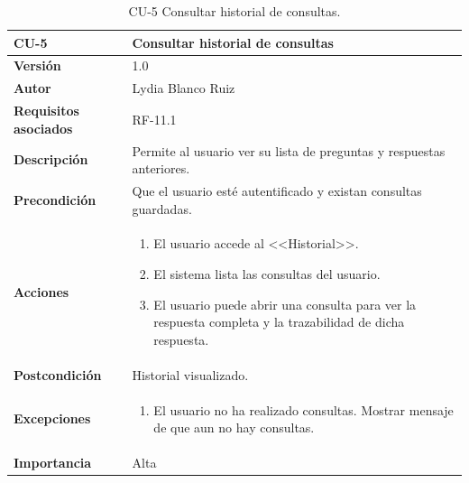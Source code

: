 \begin{table}[p]
	\centering
	\begin{tabularx}{\linewidth}{ p{} p{} }
		\toprule
		\textbf{CU-5}    & \textbf{Consultar historial de consultas}\\
		\toprule
		\textbf{Versión}              & 1.0    \\
		\textbf{Autor}                & Lydia Blanco Ruiz \\
		\textbf{Requisitos asociados} & RF-11.1 \\
		\textbf{Descripción}          & Permite al usuario ver su lista de preguntas y respuestas anteriores. \\
		\textbf{Precondición}         & Que el usuario esté autentificado y existan consultas guardadas. \\
		\textbf{Acciones}             &
		\begin{enumerate}
			\def\labelenumi{\arabic{enumi}.}
			\tightlist
			\item El usuario accede al <<Historial>>.
			\item El sistema lista las consultas del usuario.
			\item El usuario puede abrir una consulta para ver la respuesta completa y la trazabilidad de dicha respuesta.
		\end{enumerate}\\
		\textbf{Postcondición}        & Historial visualizado. \\
		\textbf{Excepciones}          & 
		\begin{enumerate}
			\def\labelenumi{\arabic{enumi}.}
			\tightlist
			\item El usuario no ha realizado consultas. Mostrar mensaje de que aun no hay consultas. 	
		\end{enumerate}\\
		\textbf{Importancia}          & Alta  \\
		\bottomrule
	\end{tabularx}
	\caption{CU-5 Consultar historial de consultas.}
\end{table}

